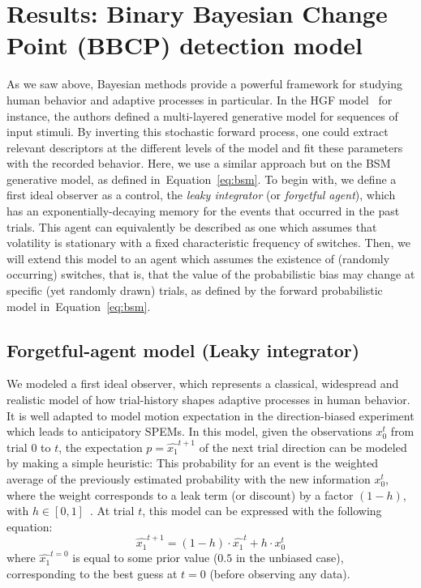 \documentclass[12pt,english]{article}%
\newcommand{\eql}[1]{\begin{equation}#1\end{equation}}
\newcommand{\citep}[1]{\parencite{#1}}
\newcommand{\seeEq}[1]{Equation~\ref{eq:#1}}
\begin{document}
\section{Results: Binary Bayesian Change Point (BBCP) detection model}
\label{sec:bayesian_change_point}
%
%
As we saw above, Bayesian methods provide a powerful framework for studying human behavior and adaptive  processes in particular.
In the HGF model~\citep{Mathys11} for instance, the
authors defined a multi-layered generative model for
sequences of input stimuli.
By inverting this stochastic forward process,
one could extract relevant descriptors at the different levels of the model
and fit these parameters with the recorded behavior.
Here, we use a similar approach but on the BSM generative model,
as defined in~\seeEq{bsm}.
To begin with, we define a first ideal observer as a control, the \textit{leaky integrator} (or \textit{forgetful agent}),
which has an exponentially-decaying memory for the events that occurred in the past trials.
This agent can equivalently be described as one
which assumes that volatility is stationary with a fixed characteristic frequency of switches.
Then, we will extend this model to an agent
which assumes the existence of (randomly occurring) switches, that is,
that the value of the probabilistic bias may change
at specific (yet randomly drawn) trials,
as defined by the forward probabilistic model in~\seeEq{bsm}.
%
\subsection{Forgetful-agent model (Leaky integrator)}%
We modeled a first ideal observer,
which represents a classical, widespread and
realistic model of how trial-history shapes
adaptive processes in human behavior.
It is well adapted to model motion expectation in the direction-biased experiment which leads to anticipatory SPEMs.
In this model, given the observations $x_0^t$ from trial $0$ to $t$,
the expectation $p=\hat{x_1}^{t+1}$ of the next trial direction can be modeled by making a simple heuristic:
This probability for an event is the weighted average of
the previously estimated probability with the new information $x_0^t$,
where the weight corresponds to a leak term (or discount)
by a factor $(1 - h)$, with $h \in [0, 1]$~\citep{Anderson2006}.
At trial $t$, this model can be expressed with the following equation:
\eql{
\hat{x_1}^{t+1} = (1 - h) \cdot \hat{x_1}^{t} + h \cdot x_0^t
\label{eq:leaky}}
where $\hat{x_1}^{t=0}$ is equal to some prior value ($0.5$ in the unbiased case),
corresponding to the best guess at $t=0$ (before observing any data).
\end{document}
